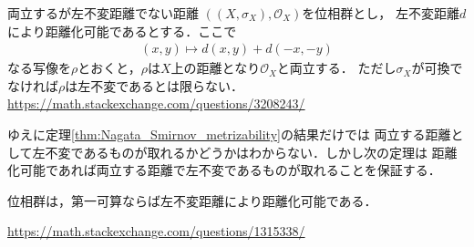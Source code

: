 	\begin{itembox}[l]{両立するが左不変距離でない距離}
		$\left(\left(X,\sigma_X\right),\mathscr{O}_X\right)$を位相群とし，
		左不変距離$d$により距離化可能であるとする．ここで
		\begin{align}
			(x,y) \longmapsto d(x,y) + d(-x,-y)
		\end{align}
		なる写像を$\rho$とおくと，$\rho$は$X$上の距離となり$\mathscr{O}_X$と両立する．
		ただし$\sigma_X$が可換でなければ$\rho$は左不変であるとは限らない．
		\url{https://math.stackexchange.com/questions/3208243/}
	\end{itembox}
	
	ゆえに定理\ref{thm:Nagata_Smirnov_metrizability}の結果だけでは
	両立する距離として左不変であるものが取れるかどうかはわからない．しかし次の定理は
	距離化可能であれば両立する距離で左不変であるものが取れることを保証する．
	
	\begin{screen}
		\begin{thm}
			位相群は，第一可算ならば左不変距離により距離化可能である．
		\end{thm}
	\end{screen}
	
	\url{https://math.stackexchange.com/questions/1315338/}
	